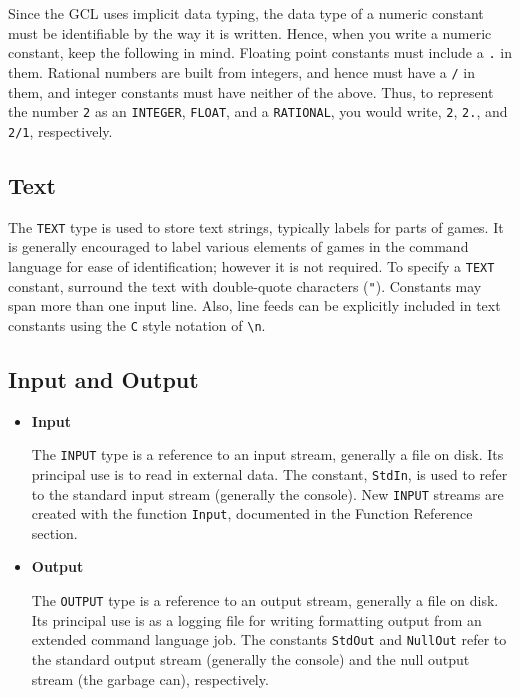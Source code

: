Since the GCL uses implicit data typing, the data type of a numeric
constant must be identifiable by the way it is written.  Hence, when
you write a numeric constant, keep the following in mind.  Floating
point constants must include a \verb+.+ in them.  Rational numbers are
built from integers, and hence must have a \verb+/+ in them, and
integer constants must have neither of the above. Thus, to represent
the number \verb+2+ as an \verb+INTEGER+, \verb+FLOAT+, and a
\verb+RATIONAL+, you would write, \verb+2+, \verb+2.+, and \verb+2/1+,
respectively.

\subsection{Text}

The {\tt TEXT} type is used to store text strings, typically labels
for parts of games.  It is generally encouraged to label various
elements of games in the command language for ease of identification;
however it is not required.  To specify a {\tt TEXT} constant,
surround the text with double-quote characters ({\tt "}).  Constants
may span more than one input line.  Also, line feeds can be explicitly
included in text constants using the \verb+C+ style notation of
\verb+\n+. 

\subsection{Input and Output}

\begin{itemize}
\item{\bf Input}

The {\tt INPUT} type is a reference to an input stream, generally a
file on disk.  Its principal use is to read in external data.  The
constant, \verb+StdIn+, is used to refer to the standard input stream
(generally the console).  New \verb+INPUT+ streams are created with
the function \verb+Input+, documented in the Function Reference
section.

\item{\bf Output}

The {\tt OUTPUT} type is a reference to an output stream, generally a
file on disk.  Its principal use is as a logging file for writing
formatting output from an extended command language job.  The
constants \verb+StdOut+ and \verb+NullOut+ refer to the standard
output stream (generally the console) and the null output stream (the
garbage can), respectively.
\end{itemize}


